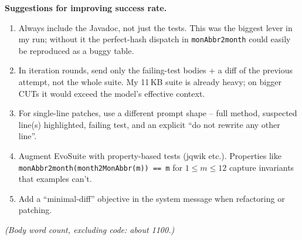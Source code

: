 \documentclass[manuscript,review,nonacm]{acmart}
\begin{document}
\textbf{Suggestions for improving success rate.}
\begin{enumerate}\itemsep1pt
\item Always include the Javadoc, not just the tests. This was the
      biggest lever in my run; without it the perfect-hash dispatch
      in \texttt{monAbbr2month} could easily be reproduced as a
      buggy table.
\item In iteration rounds, send only the failing-test bodies + a
      diff of the previous attempt, not the whole suite. My 11\,KB
      suite is already heavy; on bigger CUTs it would exceed the
      model's effective context.
\item For single-line patches, use a different prompt shape -- full
      method, suspected line(s) highlighted, failing test, and an
      explicit ``do not rewrite any other line''.
\item Augment EvoSuite with property-based tests (jqwik etc.).
      Properties like \texttt{monAbbr2month(month2MonAbbr(m)) == m}
      for $1\le m \le 12$ capture invariants that examples can't.
\item Add a ``minimal-diff'' objective in the system message when
      refactoring or patching.
\end{enumerate}

\noindent\textit{(Body word count, excluding code: about 1100.)}
\end{document}
